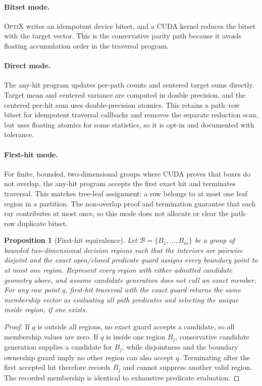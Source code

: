 \documentclass[11pt]{article}
\newtheorem{proposition}{Proposition}
\newcommand{\optix}{\textsc{OptiX}\xspace}
\begin{document}
\paragraph{Bitset mode.}
\optix writes an idempotent device bitset, and a CUDA kernel reduces the bitset
with the target vector. This is the conservative parity path because it avoids
floating accumulation order in the traversal program.

\paragraph{Direct mode.}
The any-hit program updates per-path counts and centered target sums directly.
Target mean and centered variance are computed in double precision, and the
centered per-hit sum uses double-precision atomics. This retains a path--row
bitset for idempotent traversal callbacks and removes
the separate reduction scan, but uses floating atomics for
some statistics, so it is opt-in and documented with tolerance.

\paragraph{First-hit mode.}
For finite, bounded, two-dimensional groups where CUDA proves that boxes do not
overlap, the any-hit program accepts the first exact hit and terminates
traversal. This matches tree-leaf assignment: a row belongs to at most one leaf
region in a partition. The non-overlap proof and termination guarantee that each
ray contributes at most once, so this mode does not allocate or clear the
path--row duplicate bitset.

\begin{proposition}[First-hit equivalence]
Let $\mathcal{B}=\{B_1,\ldots,B_m\}$ be a group of bounded two-dimensional
decision regions such that the interiors are pairwise disjoint and the exact
open/closed predicate guard assigns every boundary point to at most one region.
Represent every region with either admitted candidate geometry above, and assume
candidate generation does not cull an exact member. For any row point $q$,
first-hit traversal with the exact guard returns the same
membership vector as evaluating all path predicates and selecting the unique
inside region, if one exists.
\end{proposition}

\begin{proof}
If $q$ is outside all regions, no exact guard accepts a candidate, so all
membership values are zero. If $q$ is inside one region $B_j$, conservative
candidate generation supplies a candidate for $B_j$, while disjointness and the boundary
ownership guard imply no other region can also accept $q$. Terminating after the
first accepted hit therefore records $B_j$ and cannot suppress another valid
region. The recorded membership is identical to exhaustive predicate evaluation.
\qedhere
\end{proof}
\end{document}
